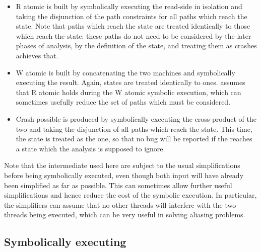 \begin{itemize}
\item R atomic is built by symbolically executing the read-side
  {\StateMachine} in isolation and taking the disjunction of the path
  constraints for all paths which reach the  state.
  Note that paths which reach the  state are treated
  identically to those which reach the  state: these
  paths do not need to be considered by the later phases of analysis,
  by the definition of the  state, and treating them
  as crashes achieves that.
\item W atomic is built by concatenating the two machines and
  symbolically executing the result.  Again,  states
  are treated identically to  ones.  {\Technique} assumes
  that R atomic holds during the W atomic symbolic execution, which
  can sometimes usefully reduce the set of paths which must be
  considered.
\item Crash possible is produced by symbolically executing the
  cross-product of the two {\StateMachines} and taking the disjunction of all paths
  which reach the  state.  This time, the
   state is treated as the  one, so
  that no bug will be reported if the {\StateMachine} reaches a state
  which the analysis is supposed to ignore.
\end{itemize}

Note that the intermediate {\StateMachines} used here are subject to
the usual simplifications before being symbolically executed, even
though both input {\StateMachines} will have already been simplified
as far as possible.  This can sometimes allow further useful
simplifications and hence reduce the cost of the symbolic execution.
In particular, the simplifiers can assume that no other threads will
interfere with the two threads being executed, which can be very
useful in solving aliasing problems.

\subsection{Symbolically executing {\StateMachines}}


